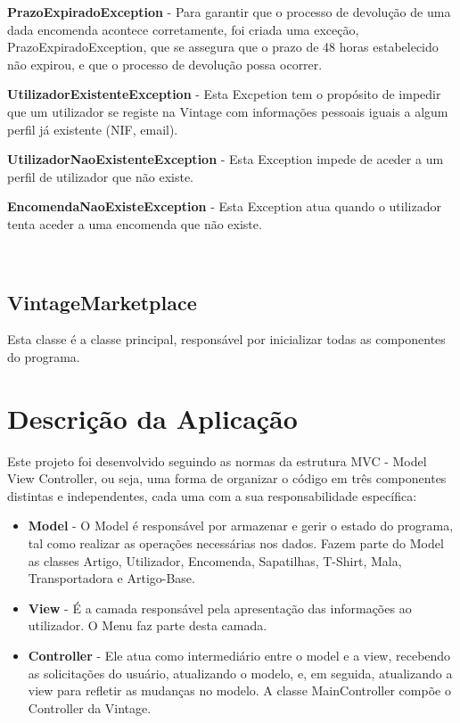 \documentclass[a4paper]{report}
\begin{document}
    \textbf{PrazoExpiradoException} - Para garantir que o processo de devolução de uma dada encomenda acontece corretamente, foi criada uma exceção, PrazoExpiradoException, que se assegura que o prazo de 48 horas estabelecido não expirou, e que o processo de devolução possa ocorrer.

    \textbf{UtilizadorExistenteException} - Esta Excpetion tem o propósito de impedir que um utilizador se registe na Vintage com informações pessoais iguais a algum perfil já existente (NIF, email).

    \textbf{UtilizadorNaoExistenteException} - Esta Exception impede de aceder a um perfil de utilizador que não existe.
    
    \textbf{EncomendaNaoExisteException} - Esta Exception atua quando o utilizador tenta aceder a uma encomenda que não existe.

    \
    \section{VintageMarketplace}
    \par Esta classe é a classe principal, responsável por inicializar todas as componentes do programa.


    \chapter{Descrição da Aplicação}
    \par Este projeto foi desenvolvido seguindo as normas da estrutura MVC - Model View Controller, ou seja, uma forma de organizar o código em três componentes distintas e independentes, cada uma com a sua responsabilidade específica:
    \begin{itemize}
    \item \textbf{Model} - O Model é responsável por armazenar e gerir o estado do programa, tal como realizar as operações necessárias nos dados. Fazem parte do Model as classes Artigo, Utilizador, Encomenda, Sapatilhas, T-Shirt, Mala, Transportadora e Artigo-Base.
    
    \item \textbf{View} - É a camada responsável pela apresentação das informações ao utilizador. O Menu faz parte desta camada.
    
    \item \textbf{Controller} - Ele atua como intermediário entre o model e a view, recebendo as solicitações do usuário, atualizando o modelo, e, em seguida, atualizando a view para refletir as mudanças no modelo.
    A classe MainController compõe o Controller da Vintage.
    
    \end{itemize}
    
\end{document}
